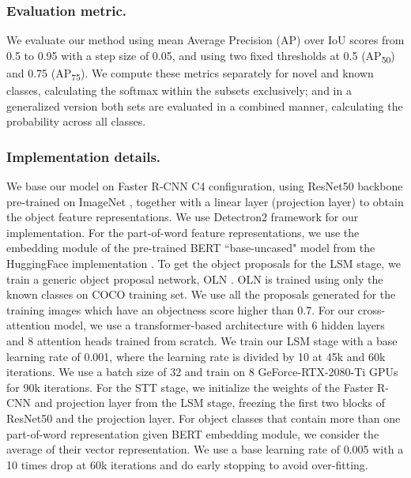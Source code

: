  \subsubsection{Evaluation metric.} 
We evaluate our method using mean Average Precision (AP) over IoU scores from 0.5 to 0.95 with a step size of 0.05, and using two fixed thresholds at 0.5 (AP\textsubscript{50}) and 0.75 (AP\textsubscript{75}). We compute these metrics separately for novel and known classes, calculating the softmax within the subsets exclusively; and in a generalized version both sets are evaluated in a combined manner, calculating the probability across all classes.

\subsubsection{Implementation details.}
We base our model on Faster R-CNN C4 \cite{NIPS2015_14bfa6bb} configuration, using ResNet50 \cite{7780459} backbone pre-trained on ImageNet \cite{5206848}, together with a linear layer (projection layer) to obtain the object feature representations. We use Detectron2 framework \cite{wu2019detectron2} for our implementation. For the part-of-word feature representations, we use the embedding module of the pre-trained BERT \cite{DBLP:journals/corr/abs-1810-04805} ``base-uncased" model from the HuggingFace implementation \cite{wolf-etal-2020-transformers}. To get the object proposals for the LSM stage, we train a generic object proposal network, OLN \cite{kim2021oln}. OLN is trained using only the known classes on COCO training set. We use all the proposals generated for the training images which have an objectness score higher than 0.7. For our cross-attention model, we use a transformer-based architecture with 6 hidden layers and 8 attention heads trained from scratch. We train our LSM stage with a base learning rate of 0.001, where the learning rate is divided by 10 at 45k and 60k iterations. We use a batch size of 32 and train on 8 GeForce-RTX-2080-Ti GPUs for 90k iterations.
For the STT stage, we initialize the weights of the Faster R-CNN and projection layer from the LSM stage, freezing the first two blocks of ResNet50 and the projection layer. For object classes that contain more than one part-of-word representation given BERT embedding module, we consider the average of their vector representation. We use a base learning rate of 0.005 with a 10 times drop at 60k iterations and do early stopping to avoid over-fitting. 


